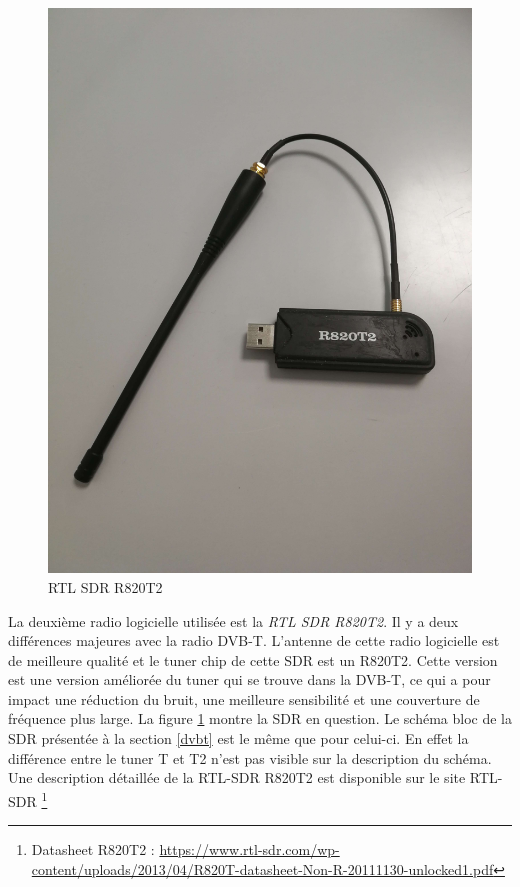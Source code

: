 \begin{figure}[h]
\centering

\includegraphics[scale=0.08]{images/r820t2.png}
\caption{RTL SDR R820T2}\label{term32}
\end{figure}

La deuxième radio logicielle utilisée est la \textit{RTL SDR R820T2}. Il y a deux différences majeures avec la radio \ac{DVB-T}. L'antenne de cette radio logicielle est de meilleure qualité et le tuner chip de cette SDR est un R820T2. Cette version est une version améliorée du tuner qui se trouve dans la \ac{DVB-T}, ce qui a pour impact une réduction du bruit, une meilleure sensibilité et une couverture de fréquence plus large. La figure \ref{term32} montre la SDR en question. Le schéma bloc de la SDR présentée à la section \ref{dvbt} est le même que pour celui-ci. En effet la différence entre le tuner T et T2 n'est pas visible sur la description du schéma. Une description détaillée de la RTL-SDR R820T2 est disponible sur le site RTL-SDR \footnote{Datasheet R820T2 : \href{https://www.rtl-sdr.com/wp-content/uploads/2013/04/R820T_datasheet-Non_R-20111130_unlocked1.pdf}{https://www.rtl-sdr.com/wp-content/uploads/2013/04/R820T-datasheet-Non-R-20111130-unlocked1.pdf}}


